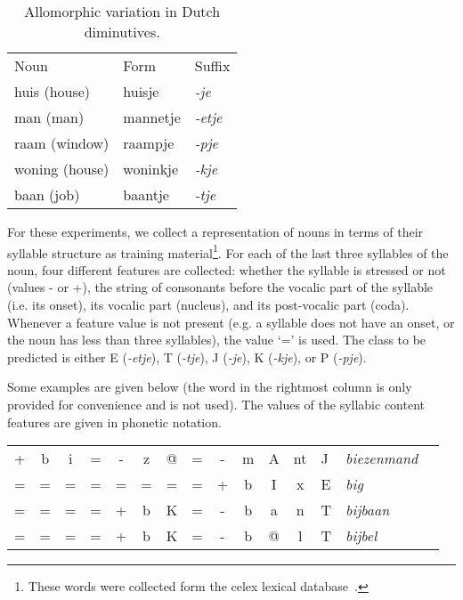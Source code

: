 \documentclass{report}
\begin{document}
\begin{table}[ht]
\begin{center}
\begin{tabular}{l|l|l}
Noun & Form & Suffix \\
\noalign{\smallskip}
\hline
\noalign{\smallskip}
huis (house) & huisje & {\em -je} \\
man (man) & mannetje & {\em -etje\/} \\
raam (window) & raampje & {\em -pje\/} \\
woning (house) & woninkje & {\em -kje\/} \\
baan (job) & baantje & {\em -tje\/} \\
\end{tabular}
\caption{Allomorphic variation in Dutch diminutives.}\label{variation}
\end{center}
\end{table}

For these experiments, we collect a representation of nouns in terms
of their syllable structure as training material\footnote{These words
  were collected form the {\sc celex} lexical
  database~\cite{Baayen+93}.}. For each of the last three syllables of
the noun, four different features are collected: whether the syllable
is stressed or not (values - or +), the string of consonants before
the vocalic part of the syllable (i.e. its onset), its vocalic part
(nucleus), and its post-vocalic part (coda). Whenever a feature value
is not present (e.g. a syllable does not have an onset, or the noun
has less than three syllables), the value `=' is used. The class to be
predicted is either E ({\em -etje}), T ({\em -tje}), J ({\em -je}), K
({\em -kje}), or P ({\em -pje}).

Some examples are given below (the word in the rightmost column is only provided for
convenience and is not used). The values of the syllabic content
features are given in phonetic notation.

\begin{table}[ht]
\begin{center}
\begin{tabular}{cccccccccccc|l|l|l}
+ & b & i & = & - & z & @ & = & - & m & A & nt & J & {\em biezenmand} \\
= & = & = & = & = & = & = & = & + & b & I & x & E & {\em big}\\
= & = & = & = & + & b & K & = & - & b & a & n & T & {\em bijbaan}\\
= & = & = & = & + & b & K & = & - & b & @ & l & T & {\em bijbel}\\
\end{tabular}
\end{center}
\end{table}
\end{document}
